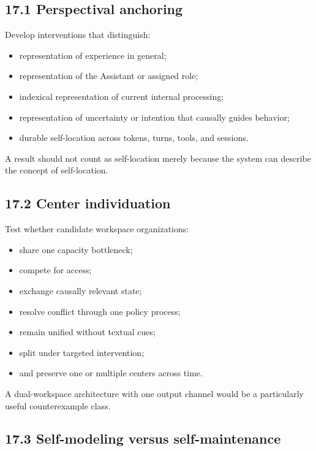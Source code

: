 \documentclass[
  11pt,
]{article}
\providecommand{\tightlist}{%
  \setlength{\itemsep}{0pt}\setlength{\parskip}{0pt}}
\begin{document}
\subsection{17.1 Perspectival anchoring}\label{perspectival-anchoring-1}

Develop interventions that distinguish:

\begin{itemize}
\tightlist
\item
  representation of experience in general;
\item
  representation of the Assistant or assigned role;
\item
  indexical representation of current internal processing;
\item
  representation of uncertainty or intention that causally guides
  behavior;
\item
  durable self-location across tokens, turns, tools, and sessions.
\end{itemize}

A result should not count as self-location merely because the system can
describe the concept of self-location.

\subsection{17.2 Center individuation}\label{center-individuation-1}

Test whether candidate workspace organizations:

\begin{itemize}
\tightlist
\item
  share one capacity bottleneck;
\item
  compete for access;
\item
  exchange causally relevant state;
\item
  resolve conflict through one policy process;
\item
  remain unified without textual cues;
\item
  split under targeted intervention;
\item
  and preserve one or multiple centers across time.
\end{itemize}

A dual-workspace architecture with one output channel would be a
particularly useful counterexample class.

\subsection{17.3 Self-modeling versus
self-maintenance}\label{self-modeling-versus-self-maintenance}
\end{document}
